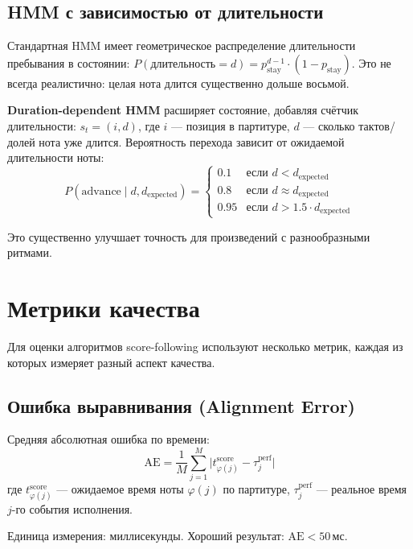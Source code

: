\documentclass[a4paper,11pt]{article}
\begin{document}
\subsection{HMM с зависимостью от длительности}

Стандартная HMM имеет геометрическое распределение длительности
пребывания в состоянии: $P(\text{длительность} = d) = p_{\text{stay}}^{d-1}
\cdot (1 - p_{\text{stay}})$. Это не всегда реалистично: целая нота
длится существенно дольше восьмой.

\textbf{Duration-dependent HMM} расширяет состояние, добавляя счётчик
длительности: $s_t = (i, d)$, где $i$ --- позиция в партитуре,
$d$ --- сколько тактов/долей нота уже длится. Вероятность перехода
зависит от ожидаемой длительности ноты:
\[
  P(\text{advance} \mid d, d_{\text{expected}}) =
  \begin{cases}
    0.1 & \text{если } d < d_{\text{expected}} \\
    0.8 & \text{если } d \approx d_{\text{expected}} \\
    0.95 & \text{если } d > 1.5 \cdot d_{\text{expected}}
  \end{cases}
\]

Это существенно улучшает точность для произведений с разнообразными ритмами.


\section{Метрики качества}
\label{sec:metrics}

Для оценки алгоритмов score-following используют несколько метрик,
каждая из которых измеряет разный аспект качества.

\subsection{Ошибка выравнивания (Alignment Error)}

\begin{formulabox}[title={Alignment Error (AE)}]
Средняя абсолютная ошибка по времени:
\[
  \mathrm{AE} = \frac{1}{M} \sum_{j=1}^{M}
  \bigl|t_{\varphi(j)}^{\text{score}} - \tau_j^{\text{perf}}\bigr|
\]
где $t_{\varphi(j)}^{\text{score}}$ --- ожидаемое время ноты $\varphi(j)$ по партитуре,
$\tau_j^{\text{perf}}$ --- реальное время $j$-го события исполнения.

Единица измерения: миллисекунды. Хороший результат: $\mathrm{AE} < 50$\,мс.
\end{formulabox}
\end{document}
